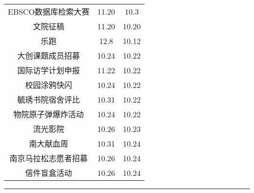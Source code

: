 \documentclass[letterpaper, 12pt]{article}
\begin{document}
\begin{multicols}{2}
{\begin{longtable}{|c|c|c|}
    EBSCO数据库检索大赛 & 11.20 & 10.3\\
    文院征稿 & 11.20 & 10.20\\
    乐跑 & 12.8 & 10.12\\
    大创课题成员招募 & 10.24 & 10.22\\
    国际访学计划申报 & 11.22 & 10.22\\
    校园涂鸦快闪 & 10.24 & 10.22\\
    毓琇书院宿舍评比 & 10.31 & 10.22\\
    物院原子弹爆炸活动 & 10.24 & 10.22\\
    流光影院 & 10.26 & 10.23\\
    南大献血周 & 10.31 & 10.24\\
    南京马拉松志愿者招募 & 10.26 & 10.24\\
    信件盲盒活动 & 10.26 & 10.24\\
    
    \hline
\end{longtable}
\unskip
\unpenalty
\unpenalty}\unvbox\colbbox
\end{multicols}
\hrule
\pagebreak
\end{document}
